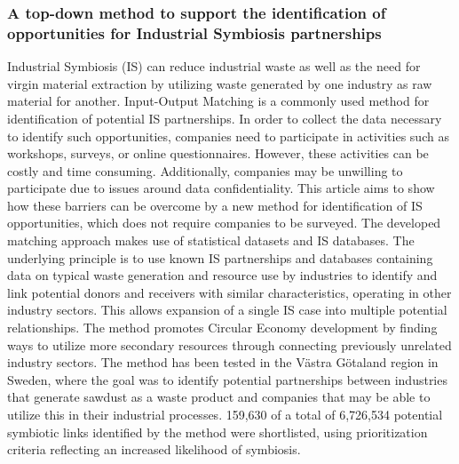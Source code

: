 \subsubsection{A top-down method to support the identification of opportunities for Industrial Symbiosis partnerships}
Industrial Symbiosis (IS) can reduce industrial waste as well as the need for virgin material extraction by utilizing waste generated by one industry as raw material for another. Input-Output Matching is a commonly used method for identification of potential IS partnerships. In order to collect the data necessary to identify such opportunities, companies need to participate in activities such as workshops, surveys, or online questionnaires. However, these activities can be costly and time consuming. Additionally, companies may be unwilling to participate due to issues around data confidentiality. This article aims to show how these barriers can be overcome by a new method for identification of IS opportunities, which does not require companies to be surveyed. The developed matching approach makes use of statistical datasets and IS databases. The underlying principle is to use known IS partnerships and databases containing data on typical waste generation and resource use by industries to identify and link potential donors and receivers with similar characteristics, operating in other industry sectors. This allows expansion of a single IS case into multiple potential relationships. The method promotes Circular Economy development by finding ways to utilize more secondary resources through connecting previously unrelated industry sectors. The method has been tested in the Västra Götaland region in Sweden, where the goal was to identify potential partnerships between industries that generate sawdust as a waste product and companies that may be able to utilize this in their industrial processes. 159,630 of a total of 6,726,534 potential symbiotic links identified by the method were shortlisted, using prioritization criteria reflecting an increased likelihood of symbiosis.

